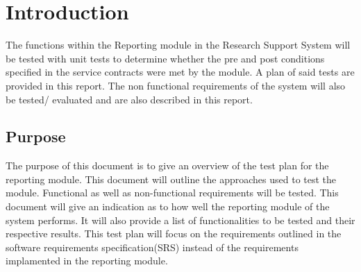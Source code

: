 %
% 	
%  	
% 
% 	
%
\section{Introduction}
The functions within the Reporting module in the Research Support System will be tested with unit tests to determine whether the pre and post conditions specified in the service contracts were met by the module. A plan of said tests are provided in this report. The non functional requirements of the system will also be tested/ evaluated and are also described in this report. 
\subsection{Purpose}
The purpose of this document is to give an overview of the test plan for the reporting module. This document will outline the approaches used to test the module. Functional as well as non-functional requirements will be tested. This document will give an indication as to how well the reporting module of the system performs. It will also provide a list of functionalities to be tested and their respective results. This test plan will focus on the requirements outlined in the software requirements specification(SRS) instead of the requirements implamented in the reporting module. 

